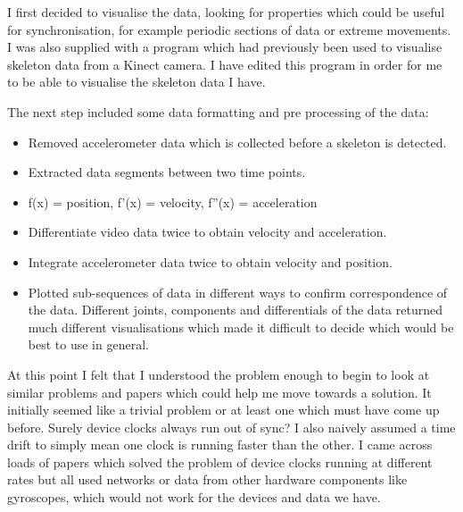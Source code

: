 I first decided to visualise the data, looking for properties which could be useful for synchronisation, for example periodic sections of data or extreme movements. I was also supplied with a program which had previously been used to visualise skeleton data from a Kinect camera. I have edited this program in order for me to be able to visualise the skeleton data I have.

The next step included some data formatting and pre processing of the data:
\begin{itemize}
    \item Removed accelerometer data which is collected before a skeleton is detected.
    \item Extracted data segments between two time points.
    \item f(x) = position, f'(x) = velocity, f''(x) = acceleration
    \item Differentiate video data twice to obtain velocity and acceleration.
    \item Integrate accelerometer data twice to obtain velocity and position.
    \item Plotted sub-sequences of data in different ways to confirm correspondence of the data. Different joints, components and differentials of the data returned much different visualisations which made it difficult to decide which would be best to use in general.
\end{itemize}

At this point I felt that I understood the problem enough to begin to look at similar problems and papers which could help me move towards a solution. It initially seemed like a trivial problem or at least one which must have come up before. Surely device clocks always run out of sync? I also naively assumed a time drift to simply mean one clock is running faster than the other. I came across loads of papers which solved the problem of device clocks running at different rates but all used networks or data from other hardware components like gyroscopes, which would not work for the devices and data we have.


